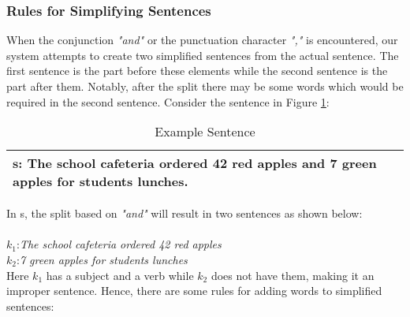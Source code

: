 \documentclass[11pt]{article}
\begin{document}
\subsubsection{Rules for Simplifying Sentences}\label{sec:SimplificationRules}
When the conjunction \textit{"and"} or  the punctuation character \textit{","} is encountered, our system attempts to create two simplified sentences from the actual sentence. The first sentence is the part before these elements while the second sentence is the part after them. Notably, after the split there may be some words which would be required in the second sentence. Consider the sentence in Figure \ref{figure:2}:
\vspace{-0.7cm}
\begin{table}[H]
\centering
\begin{tabular}{ | m{7cm} | }
\hline
$\mathbf{s}$: \small The school cafeteria ordered 42 red apples and 7 green apples for students lunches.\\
\hline
\end{tabular}
\caption{\small Example Sentence}
\label{figure:2}
\end{table}
\vspace{0.3cm}
In s, the split based on \textit{"and"} will result in two sentences as shown below:
\\
\\
$\mathit{k_{1}}$:\textit{The school cafeteria ordered 42 red apples}\\
$\mathit{k_{2}}$:\textit{7 green apples for students lunches}
\\
Here $\mathit{k_{1}}$ has a subject and a verb while $\mathit{k_{2}}$ does not have them, making it an improper sentence. Hence, there are some rules for adding words to simplified sentences:
\end{document}

